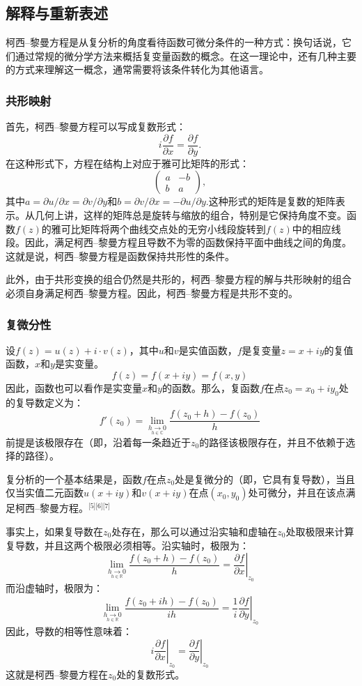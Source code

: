 \subsection{解释与重新表述}  
柯西–黎曼方程是从复分析的角度看待函数可微分条件的一种方式：换句话说，它们通过常规的微分学方法来概括复变量函数的概念。在这一理论中，还有几种主要的方式来理解这一概念，通常需要将该条件转化为其他语言。
\subsubsection{共形映射}   
首先，柯西–黎曼方程可以写成复数形式：
\[
i \frac{\partial f}{\partial x} = \frac{\partial f}{\partial y}.~
\]
在这种形式下，方程在结构上对应于雅可比矩阵的形式：
\[
\begin{pmatrix} a & -b \\ b & a \end{pmatrix},~
\]
其中\(a=\partial u/\partial x=\partial v/\partial y\)和\(b=\partial v/\partial x=-\partial u/\partial y\).这种形式的矩阵是复数的矩阵表示。从几何上讲，这样的矩阵总是旋转与缩放的组合，特别是它保持角度不变。函数\(f(z)\)的雅可比矩阵将两个曲线交点处的无穷小线段旋转到\(f(z)\)中的相应线段。因此，满足柯西–黎曼方程且导数不为零的函数保持平面中曲线之间的角度。这就是说，柯西–黎曼方程是函数保持共形性的条件。

此外，由于共形变换的组合仍然是共形的，柯西–黎曼方程的解与共形映射的组合必须自身满足柯西–黎曼方程。因此，柯西–黎曼方程是共形不变的。
\subsubsection{复微分性}  
设\( f(z) = u(z) + i \cdot v(z) \)，其中\( u \)和\( v \)是实值函数，\( f \)是复变量\( z = x + iy \)的复值函数，\(x\)和\(y\)是实变量。
\[f(z) = f(x + iy) = f(x, y)~\]
因此，函数也可以看作是实变量\(x\)和\(y\)的函数。那么，复函数\(f\)在点\( z_0 = x_0 + iy_0 \)处的复导数定义为：
\[
f'(z_0) = \lim_{\underset{h \in \mathbb{C}}{h \to 0}} \frac{f(z_0 + h) - f(z_0)}{h}~
\]
前提是该极限存在（即，沿着每一条趋近于\( z_0 \)的路径该极限存在，并且不依赖于选择的路径）。

复分析的一个基本结果是，函数\( f \)在点\( z_0 \)处是复微分的（即，它具有复导数），当且仅当实值二元函数\( u(x + iy) \)和\( v(x + iy) \)在点\( (x_0, y_0) \)处可微分，并且在该点满足柯西–黎曼方程。\(^\text{[5][6][7]}\)

事实上，如果复导数在\( z_0 \)处存在，那么可以通过沿实轴和虚轴在\( z_0 \)处取极限来计算复导数，并且这两个极限必须相等。沿实轴时，极限为：
\[
\lim_{\underset{h \in \mathbb{R}}{h \to 0}} \frac{f(z_0 + h) - f(z_0)}{h} = \left. \frac{\partial f}{\partial x} \right|_{z_0}~
\]
而沿虚轴时，极限为：
\[
\lim_{\underset{h \in \mathbb{R}}{h \to 0}} \frac{f(z_0 + ih) - f(z_0)}{ih} = \left. \frac{1}{i} \frac{\partial f}{\partial y} \right|_{z_0}~
\]
因此，导数的相等性意味着：
\[
i \left. \frac{\partial f}{\partial x} \right|_{z_0} = \left. \frac{\partial f}{\partial y} \right|_{z_0}~
\]
这就是柯西–黎曼方程在\( z_0 \)处的复数形式。

